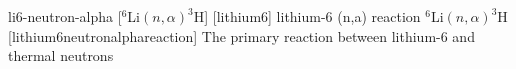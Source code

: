 \newglsXreaction%
{li6-neutron-alpha}%
[{}$^6$Li$(n,\alpha)^3$H]%
[lithium6]%
{lithium-6 (n,a) reaction}%
{{}$^6$Li$(n,\alpha)^3$H}%
[lithium6neutronalphareaction]%
{The primary reaction between lithium-6 and thermal neutrons}%